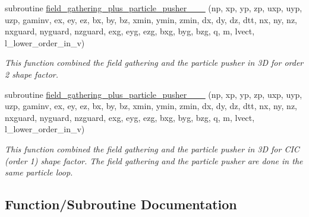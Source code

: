 \begin{DoxyCompactItemize}
subroutine \hyperlink{particles__push_8_f90_ac04a46dfecd1ade015d3bf1ff801159a}{field\+\_\+gathering\+\_\+plus\+\_\+particle\+\_\+pusher\+\_\+\_\+\_} (np, xp, yp, zp, uxp, uyp, uzp, gaminv,                                                                                                                                                   ex, ey, ez, bx, by, bz, xmin, ymin, zmin,                                                                                                                                                           dx, dy, dz, dtt, nx, ny, nz, nxguard, nyguard, nzguard,                                                                                                                                                   exg, eyg, ezg, bxg, byg, bzg, q, m, lvect, l\+\_\+lower\+\_\+order\+\_\+in\+\_\+v)
\begin{DoxyCompactList}\small\item\em This function combined the field gathering and the particle pusher in 3D for order 2 shape factor. \end{DoxyCompactList}\item 
subroutine \hyperlink{particles__push_8_f90_a87ad05cb46ac948188f2738ca82ab6a3}{field\+\_\+gathering\+\_\+plus\+\_\+particle\+\_\+pusher\+\_\+\_\+\_} (np, xp, yp, zp, uxp, uyp, uzp, gaminv,                                                                                                                                                   ex, ey, ez, bx, by, bz, xmin, ymin, zmin,                                                                                                                                                           dx, dy, dz, dtt, nx, ny, nz, nxguard, nyguard, nzguard,                                                                                                                                                   exg, eyg, ezg, bxg, byg, bzg, q, m, lvect, l\+\_\+lower\+\_\+order\+\_\+in\+\_\+v)
\begin{DoxyCompactList}\small\item\em This function combined the field gathering and the particle pusher in 3D for C\+IC (order 1) shape factor. The field gathering and the particle pusher are done in the same particle loop. \end{DoxyCompactList}\end{DoxyCompactItemize}


\subsection{Function/\+Subroutine Documentation}
